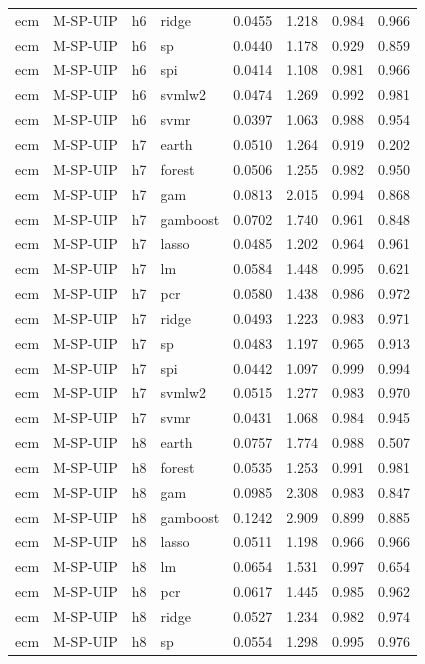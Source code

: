 \begin{ThreePartTable}
\begin{longtable}[t]{llclcccc}
ecm & M-SP-UIP & h6 & ridge & 0.0455 & 1.218 & 0.984 & 0.966\\
ecm & M-SP-UIP & h6 & sp & 0.0440 & 1.178 & 0.929 & 0.859\\
ecm & M-SP-UIP & h6 & spi & 0.0414 & 1.108 & 0.981 & 0.966\\
ecm & M-SP-UIP & h6 & svmlw2 & 0.0474 & 1.269 & 0.992 & 0.981\\
ecm & M-SP-UIP & h6 & svmr & 0.0397 & 1.063 & 0.988 & 0.954\\
\addlinespace
ecm & M-SP-UIP & h7 & earth & 0.0510 & 1.264 & 0.919 & 0.202\\
ecm & M-SP-UIP & h7 & forest & 0.0506 & 1.255 & 0.982 & 0.950\\
ecm & M-SP-UIP & h7 & gam & 0.0813 & 2.015 & 0.994 & 0.868\\
ecm & M-SP-UIP & h7 & gamboost & 0.0702 & 1.740 & 0.961 & 0.848\\
ecm & M-SP-UIP & h7 & lasso & 0.0485 & 1.202 & 0.964 & 0.961\\
ecm & M-SP-UIP & h7 & lm & 0.0584 & 1.448 & 0.995 & 0.621\\
ecm & M-SP-UIP & h7 & pcr & 0.0580 & 1.438 & 0.986 & 0.972\\
ecm & M-SP-UIP & h7 & ridge & 0.0493 & 1.223 & 0.983 & 0.971\\
ecm & M-SP-UIP & h7 & sp & 0.0483 & 1.197 & 0.965 & 0.913\\
ecm & M-SP-UIP & h7 & spi & 0.0442 & 1.097 & 0.999 & 0.994\\
ecm & M-SP-UIP & h7 & svmlw2 & 0.0515 & 1.277 & 0.983 & 0.970\\
ecm & M-SP-UIP & h7 & svmr & 0.0431 & 1.068 & 0.984 & 0.945\\
\addlinespace
ecm & M-SP-UIP & h8 & earth & 0.0757 & 1.774 & 0.988 & 0.507\\
ecm & M-SP-UIP & h8 & forest & 0.0535 & 1.253 & 0.991 & 0.981\\
ecm & M-SP-UIP & h8 & gam & 0.0985 & 2.308 & 0.983 & 0.847\\
ecm & M-SP-UIP & h8 & gamboost & 0.1242 & 2.909 & 0.899 & 0.885\\
ecm & M-SP-UIP & h8 & lasso & 0.0511 & 1.198 & 0.966 & 0.966\\
ecm & M-SP-UIP & h8 & lm & 0.0654 & 1.531 & 0.997 & 0.654\\
ecm & M-SP-UIP & h8 & pcr & 0.0617 & 1.445 & 0.985 & 0.962\\
ecm & M-SP-UIP & h8 & ridge & 0.0527 & 1.234 & 0.982 & 0.974\\
ecm & M-SP-UIP & h8 & sp & 0.0554 & 1.298 & 0.995 & 0.976\\

\end{longtable}
\end{ThreePartTable}
